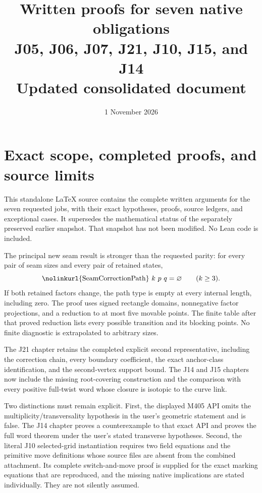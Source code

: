 \documentclass[11pt,oneside]{report}
\title{Written proofs for seven native obligations\\
\large J05, J06, J07, J21, J10, J15, and J14\\
Updated consolidated document}
\author{}
\date{1 November 2026}
\theoremstyle{definition}
\numberwithin{equation}{section}
\newcommand{\decl}[1]{\textnormal{\nolinkurl{#1}}}
\begin{document}
\hypersetup{pageanchor=false}
\maketitle
\hypersetup{pageanchor=true}
\chapter*{Exact scope, completed proofs, and source limits}

This standalone LaTeX source contains the complete written arguments for
the seven requested jobs, with their exact hypotheses, proofs, source
ledgers, and exceptional cases. It supersedes the mathematical status
of the separately preserved earlier snapshot. That snapshot has not
been modified. No Lean code is included.

The principal new seam result is stronger than the requested parity:
for every pair of seam sizes and every pair of retained states,
\[
 \decl{SeamCorrectionPath}\ k\ p\ q=\varnothing
 \qquad(k\geq3).
\]
If both retained factors change, the path type is empty at every
internal length, including zero. The proof uses signed rectangle
domains, nonnegative factor projections, and a reduction to at most
five movable points. The finite table after that proved reduction
lists every possible transition and its blocking points. No finite
diagnostic is extrapolated to arbitrary sizes.

The J21 chapter retains the completed explicit second representative,
including the correction chain, every boundary coefficient, the exact
anchor-class identification, and the second-vertex support bound.
The J14 and J15 chapters now include the missing root-covering
construction and the comparison with every positive full-twist word
whose closure is isotopic to the curve link.

Two distinctions must remain explicit. First, the displayed M405 API
omits the multiplicity/transversality hypothesis in the user's
geometric statement and is false. The J14 chapter proves a
counterexample to that exact API and proves the full word theorem
under the user's stated transverse hypotheses. Second, the literal
J10 selected-grid instantiation requires two field equations and the
primitive move definitions whose source files are absent from the
combined attachment. Its complete switch-and-move proof is supplied
for the exact marking equations that are reproduced, and the missing
native implications are stated individually. They are not silently
assumed.
\end{document}
